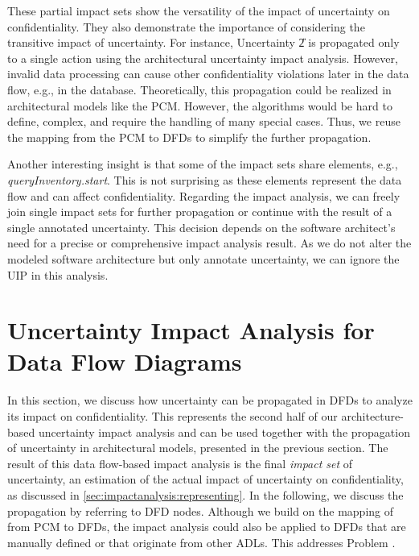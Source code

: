 These partial impact sets show the versatility of the impact of uncertainty on confidentiality.
They also demonstrate the importance of considering the transitive impact of uncertainty.
For instance, Uncertainty \U{2} is propagated only to a single action using the architectural uncertainty impact analysis.
However, invalid data processing can cause other confidentiality violations later in the data flow, e.g., in the database.
Theoretically, this propagation could be realized in architectural models like the \ac{PCM}.
However, the algorithms would be hard to define, complex, and require the handling of many special cases.
Thus, we reuse the mapping from the \ac{PCM} to \acp{DFD} to simplify the further propagation.

Another interesting insight is that some of the impact sets share elements, e.g., \emph{queryInventory.start}.
This is not surprising as these elements represent the data flow and can affect confidentiality.
Regarding the impact analysis, we can freely join single impact sets for further propagation or continue with the result of a single annotated uncertainty.
This decision depends on the software architect's need for a precise or comprehensive impact analysis result.
As we do not alter the modeled software architecture but only annotate uncertainty, we can ignore the \ac{UIP} in this analysis.






\section{Uncertainty Impact Analysis for Data Flow Diagrams}%
\label{sec:impactanalysis:dfdpropagation}

In this section, we discuss how uncertainty can be propagated in \acp{DFD} to analyze its impact on confidentiality.
This represents the second half of our architecture-based uncertainty impact analysis \cite{hahner_architecture-based_2023} and can be used together with the propagation of uncertainty in architectural models, presented in the previous section. 
The result of this data flow-based impact analysis is the final \emph{impact set} of uncertainty, an estimation of the actual impact of uncertainty on confidentiality, as discussed in \autoref{sec:impactanalysis:representing}.
In the following, we discuss the propagation by referring to \ac{DFD} nodes.
Although we build on the mapping of \textcite{seifermann_architectural_2022} from \ac{PCM} to \acp{DFD}, the impact analysis could also be applied to \acp{DFD} that are manually defined or that originate from other \acp{ADL}.
This addresses Problem .

